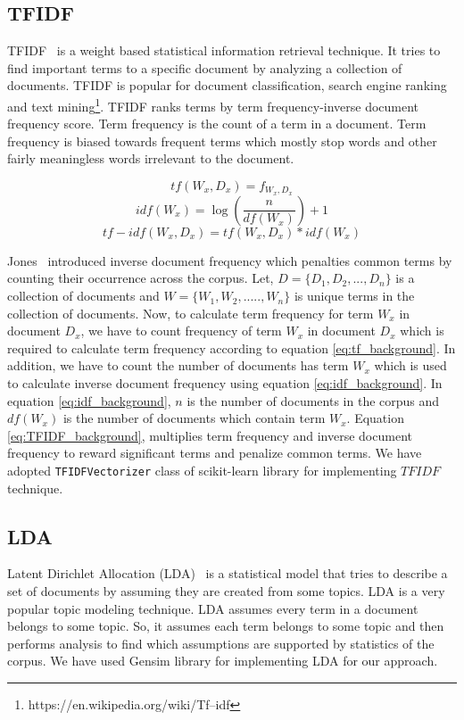 \subsection{TFIDF}
\label{background:tfidf}
TFIDF~\cite{ramos2003usingTfidfRelevance} is a weight based statistical information retrieval technique. It tries to find important terms to a specific document by analyzing a collection of documents. TFIDF is popular for document classification, search engine ranking and text mining\footnote{https://en.wikipedia.org/wiki/Tf–idf}. TFIDF ranks terms by term frequency-inverse document frequency score. Term frequency is the count of a term in a document. Term frequency is biased towards frequent terms which mostly stop words and other fairly meaningless words irrelevant to the document. 

\begin{equation}
    tf (W_x, D_x) = f_{W_x,D_x}
    \label{eq:tf_background}
\end{equation}
\begin{equation}
    idf(W_x) = \log(\frac{n}{df(W_x)})+1
    \label{eq:idf_background}
\end{equation}
\begin{equation}
    tf-idf(W_x, D_x) = tf(W_x,D_x) * idf(W_x)
    \label{eq:TFIDF_background}
\end{equation}


Jones~\cite{jones1972statistical} introduced inverse document frequency which penalties common terms by counting their occurrence across the corpus. Let, $D = \{D_1, D_2, ..., D_n\}$ is a collection of documents and $W = \{W_1, W_2, ....., W_n\}$ is unique terms in the collection of documents. Now, to calculate term frequency for term $W_x$ in document $D_x$, we have to count frequency of term $W_x$ in  document $D_x$ which is required to calculate term frequency according to equation \ref{eq:tf_background}. In addition, we have to count the number of documents has term $W_x$ which is used to calculate inverse document frequency using equation \ref{eq:idf_background}. In equation \ref{eq:idf_background}, $n$ is the number of documents in the corpus and $df(W_x)$ is the number of documents which contain term $W_x$. Equation \ref{eq:TFIDF_background}, multiplies term frequency and inverse document frequency to reward significant terms and penalize common terms. We have adopted \texttt{TFIDFVectorizer} class of scikit-learn \cite{scikit-learn} library for implementing $TFIDF$ technique.

\subsection{LDA}
\label{background:lda}
Latent Dirichlet Allocation (LDA)~\cite{blei2003latentLDA} is a statistical model that tries to describe a set of documents by assuming they are created from some topics. LDA is a very popular topic modeling technique. LDA assumes every term in a document belongs to some topic. So, it assumes each term belongs to some topic and then performs analysis to find which assumptions are supported by statistics of the corpus. We have used Gensim \cite{gensim} library for implementing LDA for our approach.

